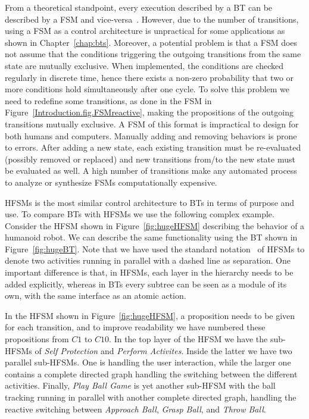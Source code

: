 From a theoretical standpoint, every execution described by a BT can be described by a FSM and vice-versa~\cite{ogren,Marzinotto14}. However, due to the number of transitions, using a FSM as a  control architecture  is unpractical for some applications as shown in Chapter~\ref{chap:bts}. Moreover, 
a potential problem is that
a FSM does not assume that the conditions triggering the outgoing transitions from the same state are mutually exclusive. When implemented, the conditions are checked regularly in discrete time, hence there exists a non-zero probability that two or more conditions hold simultaneously after one cycle. To solve this problem we need to redefine some transitions, as done in the FSM in Figure~\ref{Introduction.fig.FSMreactive}, making the propositions of the outgoing transitions mutually exclusive. A FSM of this format is impractical to design for both humans and computers. Manually adding and removing behaviors  is prone to errors. After adding a new state, each existing transition must be re-evaluated (possibly removed or replaced) and new transitions from/to the new state must be evaluated as well. A high number of transitions make any automated process to analyze or synthesize FSMs computationally expensive.  

HFSMs is the most similar  control architecture  to BTs in terms of purpose and use. To compare BTs with HFSMs we use the following complex example. Consider the HFSM shown in Figure~\ref{fig:hugeHFSM} describing the behavior of a humanoid robot. We can describe the same functionality using the BT shown in Figure~\ref{fig:hugeBT}. Note that we have used the standard notation~\cite{Harel87statecharts} of HFSMs to denote two activities running in parallel with a dashed line as separation. One important difference is that, in HFSMs, each layer in the hierarchy needs to be added explicitly, whereas in BTs every subtree can be seen as a module of its own, with the same interface as an atomic action.

In the HFSM shown in Figure~\ref{fig:hugeHFSM}, a proposition needs to be given for each transition, and to improve readability we have numbered these propositions from $C1$ to $C10$.
In the top layer of the HFSM we have the sub-HFSMs of \emph{Self Protection} and  \emph{Perform Activites}.
Inside the latter we have two parallel sub-HFSMs. One is handling the user interaction, while the larger one contains 
a complete directed graph handling the switching between the different activities. Finally, \emph{Play Ball Game} is yet another  sub-HFSM with the 
ball tracking running in parallel with another complete directed graph, handling the reactive switching between  \emph{Approach Ball}, \emph{Grasp Ball}, and \emph{Throw Ball}. 

